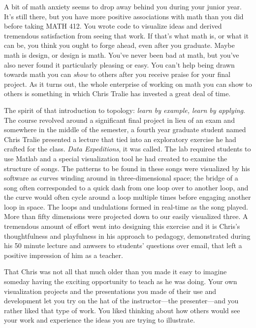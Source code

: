 \documentclass[../main.tex]{subfiles}
\begin{document}
A bit of math anxiety seems to drop away behind you during your junior year. It's still there, but you have more positive associations with math than you did before taking MATH 412. You wrote code to visualize ideas and derived tremendous satisfaction from seeing that work. If that's what math is, or what it can be, you think you ought to forge ahead, even after you graduate. Maybe math is design, or design is math. You've never been bad at math, but you've also never found it particularly pleasing or easy. You can't help being drawn towards math you can \textit{show} to others after you receive praise for your final project. As it turns out, the whole enterprise of working on math you can show to others is something in which Chris Tralie has invested a great deal of time.

The spirit of that introduction to topology: \textit{learn by example, learn by applying}. The course revolved around a significant final project in lieu of an exam and somewhere in the middle of the semester, a fourth year graduate student named Chris Tralie presented a lecture that tied into an exploratory exercise he had crafted for the class. \textit{Data Expeditions}, it was called. The lab required students to use Matlab and a special visualization tool he had created to examine the structure of songs. The patterns to be found in these songs were visualized by his software as curves winding around in three-dimensional space; the bridge of a song often corresponded to a quick dash from one loop over to another loop, and the curve would often cycle around a loop multiple times before engaging another loop in space. The loops and undulations formed in real-time as the song played. More than fifty dimensions were projected down to our easily visualized three. A tremendous amount of effort went into designing this exercise and it is Chris's thoughtfulness and playfulness in his approach to pedagogy, demonstrated during his 50 minute lecture and anwsers to students' questions over email, that left a positive impression of him as a teacher.

That Chris was not all that much older than you made it easy to imagine someday having the exciting opportunity to teach as he was doing. Your own visualization projects and the presentations you made of their use and development let you try on the hat of the instructor---the presenter---and you rather liked that type of work. You liked thinking about how others would see your work and experience the ideas you are trying to illustrate.
\end{document}
